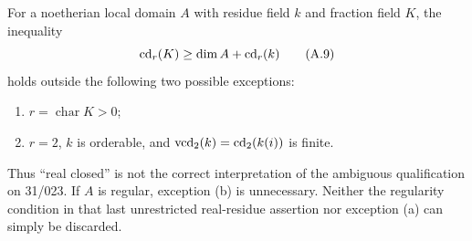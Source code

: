 \begin{theorem}
\label{A:realexception}
For a noetherian local domain $A$ with residue field $k$ and fraction field $K$, the inequality
\[
\operatorname{cd}_r(K)\geq\dim A+\operatorname{cd}_r(k)
\tag{A.9}\label{A:nine-ineq}
\]
holds outside the following two possible exceptions:
\begin{enumerate}[label=(\alph*)]
\item $r=\operatorname{char}K>0$;
\item $r=2$, $k$ is orderable, and $\operatorname{vcd}_2(k)=\operatorname{cd}_2(k(i))$ is finite.
\end{enumerate}
Thus ``real closed'' is not the correct interpretation of the ambiguous qualification on 31/023. If $A$ is regular, exception (b) is unnecessary. Neither the regularity condition in that last unrestricted real-residue assertion nor exception (a) can simply be discarded.
\end{theorem}
